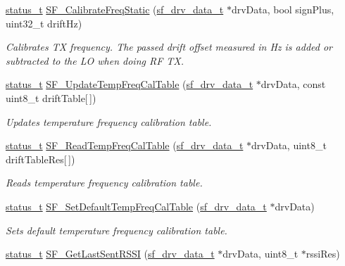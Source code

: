 \begin{DoxyCompactItemize}
\mbox{\hyperlink{group__ksdk__common_gaaabdaf7ee58ca7269bd4bf24efcde092}{status\+\_\+t}} \mbox{\hyperlink{group__sf__functions__group_ga16f222d9b0c5485b38eae13da3f5f854}{S\+F\+\_\+\+Calibrate\+Freq\+Static}} (\mbox{\hyperlink{structsf__drv__data__t}{sf\+\_\+drv\+\_\+data\+\_\+t}} $\ast$drv\+Data, bool sign\+Plus, uint32\+\_\+t drift\+Hz)
\begin{DoxyCompactList}\small\item\em Calibrates TX frequency. The passed drift offset measured in Hz is added or subtracted to the LO when doing RF TX. \end{DoxyCompactList}\item 
\mbox{\hyperlink{group__ksdk__common_gaaabdaf7ee58ca7269bd4bf24efcde092}{status\+\_\+t}} \mbox{\hyperlink{group__sf__functions__group_ga43ad188a19bc8705116123d0dc16eda0}{S\+F\+\_\+\+Update\+Temp\+Freq\+Cal\+Table}} (\mbox{\hyperlink{structsf__drv__data__t}{sf\+\_\+drv\+\_\+data\+\_\+t}} $\ast$drv\+Data, const uint8\+\_\+t drift\+Table\mbox{[}$\,$\mbox{]})
\begin{DoxyCompactList}\small\item\em Updates temperature frequency calibration table. \end{DoxyCompactList}\item 
\mbox{\hyperlink{group__ksdk__common_gaaabdaf7ee58ca7269bd4bf24efcde092}{status\+\_\+t}} \mbox{\hyperlink{group__sf__functions__group_gad989de030050a84fb1c9e4e5e29e6173}{S\+F\+\_\+\+Read\+Temp\+Freq\+Cal\+Table}} (\mbox{\hyperlink{structsf__drv__data__t}{sf\+\_\+drv\+\_\+data\+\_\+t}} $\ast$drv\+Data, uint8\+\_\+t drift\+Table\+Res\mbox{[}$\,$\mbox{]})
\begin{DoxyCompactList}\small\item\em Reads temperature frequency calibration table. \end{DoxyCompactList}\item 
\mbox{\hyperlink{group__ksdk__common_gaaabdaf7ee58ca7269bd4bf24efcde092}{status\+\_\+t}} \mbox{\hyperlink{group__sf__functions__group_gac8894d84b5416dd2c400507acd3553a1}{S\+F\+\_\+\+Set\+Default\+Temp\+Freq\+Cal\+Table}} (\mbox{\hyperlink{structsf__drv__data__t}{sf\+\_\+drv\+\_\+data\+\_\+t}} $\ast$drv\+Data)
\begin{DoxyCompactList}\small\item\em Sets default temperature frequency calibration table. \end{DoxyCompactList}\item 
\mbox{\hyperlink{group__ksdk__common_gaaabdaf7ee58ca7269bd4bf24efcde092}{status\+\_\+t}} \mbox{\hyperlink{group__sf__functions__group_ga07eaf722b934e94542d6fd74b6a981d4}{S\+F\+\_\+\+Get\+Last\+Sent\+R\+S\+SI}} (\mbox{\hyperlink{structsf__drv__data__t}{sf\+\_\+drv\+\_\+data\+\_\+t}} $\ast$drv\+Data, uint8\+\_\+t $\ast$rssi\+Res)

\end{DoxyCompactItemize}
